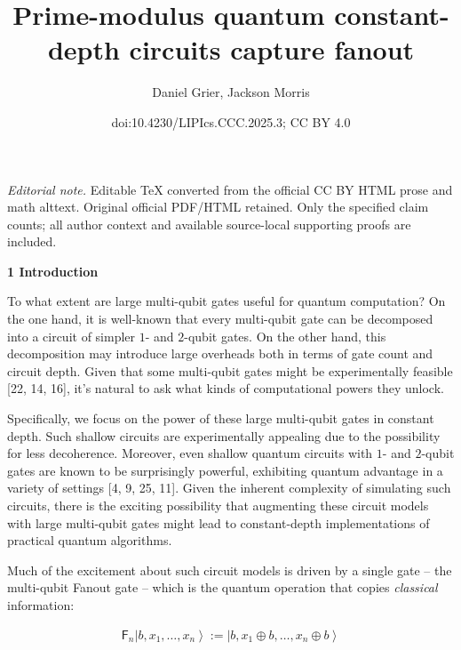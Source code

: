 \documentclass[10pt,a4paper]{article}
\title{Prime-modulus quantum constant-depth circuits capture fanout}
\author{Daniel Grier, Jackson Morris}
\date{doi:10.4230/LIPIcs.CCC.2025.3; CC BY 4.0}
\begin{document}
\maketitle
\noindent\textit{Editorial note.} Editable TeX converted from the official CC BY HTML prose and math alttext. Original official PDF/HTML retained. Only the specified claim counts; all author context and available source-local supporting proofs are included.\par\medskip


\par\medskip\noindent\textbf{
1 Introduction}\par




To what extent are large multi-qubit gates useful for quantum computation? On the one hand, it is well-known that every multi-qubit gate can be decomposed into a circuit of simpler $1$- and $2$-qubit gates. On the other hand, this decomposition may introduce large overheads both in terms of gate count and circuit depth. Given that some multi-qubit gates might be experimentally feasible [22, 14, 16], it’s natural to ask what kinds of computational powers they unlock.\par




Specifically, we focus on the power of these large multi-qubit gates in constant depth. Such shallow circuits are experimentally appealing due to the possibility for less decoherence. Moreover, even shallow quantum circuits with $1$- and $2$-qubit gates are known to be surprisingly powerful, exhibiting quantum advantage in a variety of settings [4, 9, 25, 11]. Given the inherent complexity of simulating such circuits, there is the exciting possibility that augmenting these circuit models with large multi-qubit gates might lead to constant-depth implementations of practical quantum algorithms.\par




Much of the excitement about such circuit models is driven by a single gate – the multi-qubit Fanout gate – which is the quantum operation that copies \emph{classical} information:\par


\[\begin{gathered}
\mathsf{F}_{n}\left|b,x_{1},\ldots,x_{n}\right\rangle:=\left|b,x_{1}\oplus b,\ldots,x_{n}\oplus b\right\rangle
\end{gathered}\]
\end{document}
